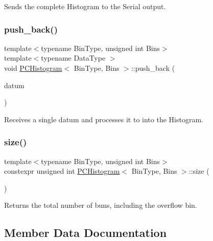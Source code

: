 Sends the complete Histogram to the Serial output. 

\mbox{\label{classPCHistogram_a0885e66d0de46bd16b72b870d7f410fc}} 
\subsubsection{\texorpdfstring{push\+\_\+back()}{push\_back()}}
{\footnotesize\ttfamily template$<$typename Bin\+Type, unsigned int Bins$>$ \\
template$<$typename Data\+Type $>$ \\
void \hyperlink{classPCHistogram}{P\+C\+Histogram}$<$ Bin\+Type, Bins $>$\+::push\+\_\+back (\begin{DoxyParamCaption}\item[{Data\+Type}]{datum }\end{DoxyParamCaption})\hspace{0.3cm}{\ttfamily [inline]}}



Receives a single datum and processes it to into the Histogram. 

\mbox{\label{classPCHistogram_a4c7558c7cebdd928c0b6e0c548baf1b9}} 
\subsubsection{\texorpdfstring{size()}{size()}}
{\footnotesize\ttfamily template$<$typename Bin\+Type, unsigned int Bins$>$ \\
constexpr unsigned int \hyperlink{classPCHistogram}{P\+C\+Histogram}$<$ Bin\+Type, Bins $>$\+::size (\begin{DoxyParamCaption}{ }\end{DoxyParamCaption})\hspace{0.3cm}{\ttfamily [inline]}}



Returns the total number of buns, including the overflow bin. 



\subsection{Member Data Documentation}
\mbox{\label{classPCHistogram_a239c7b1e34b2ecc1808e2304d71bc1e2}} 
